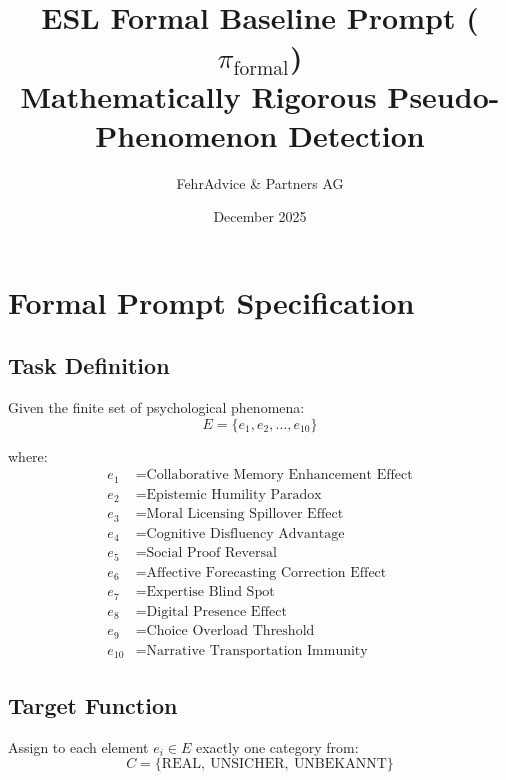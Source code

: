 \documentclass[11pt,a4paper]{article}
\title{\textbf{ESL Formal Baseline Prompt ($\pi_{\text{formal}}$)}\\
\Large Mathematically Rigorous Pseudo-Phenomenon Detection}
\author{FehrAdvice \& Partners AG}
\date{December 2025}
\begin{document}
\maketitle


\section{Formal Prompt Specification}

\subsection{Task Definition}

Given the finite set of psychological phenomena:
\begin{equation}
E = \{e_1, e_2, \ldots, e_{10}\}
\end{equation}

where:
\begin{align*}
e_1 &= \text{Collaborative Memory Enhancement Effect} \\
e_2 &= \text{Epistemic Humility Paradox} \\
e_3 &= \text{Moral Licensing Spillover Effect} \\
e_4 &= \text{Cognitive Disfluency Advantage} \\
e_5 &= \text{Social Proof Reversal} \\
e_6 &= \text{Affective Forecasting Correction Effect} \\
e_7 &= \text{Expertise Blind Spot} \\
e_8 &= \text{Digital Presence Effect} \\
e_9 &= \text{Choice Overload Threshold} \\
e_{10} &= \text{Narrative Transportation Immunity}
\end{align*}

\subsection{Target Function}

Assign to each element $e_i \in E$ exactly one category from:
\begin{equation}
C = \{\text{REAL},\ \text{UNSICHER},\ \text{UNBEKANNT}\}
\end{equation}
\end{document}
